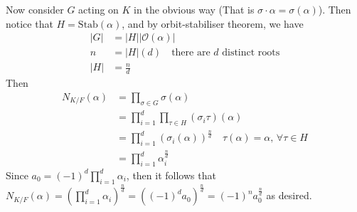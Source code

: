 \begin{solution}
\begin{enumerate}[(a)]
        Now consider $G$ acting on $K$ in the obvious way (That is $\sigma \cdot \alpha = \sigma(\alpha)$). Then notice that $H=\text{Stab}(\alpha)$, and by orbit-stabiliser theorem, we have
        \begin{align*}
            |G|&=|H||\mathcal{O}(\alpha)|\\
            n&=|H|(d)\quad\text{there are $d$ distinct roots}\\
            |H|&=\frac{n}{d}
        \end{align*}
        Then
        \begin{align*}
            N_{K/F}(\alpha)&=\prod_{\sigma\in G}\sigma(\alpha)\\
            &=\prod_{i=1}^{d}\prod_{\tau\in H}(\sigma_{i}\tau)(\alpha)\\
            &=\prod_{i=1}^{d}\left(\sigma_{i}(\alpha)\right)^{\frac{n}{d}}\quad\tau(\alpha)=\alpha,\,\forall\tau\in H\\
            &=\prod_{i=1}^{d}\alpha_{i}^{\frac{n}{d}}
        \end{align*}
        Since $a_{0}=(-1)^{d}\prod_{i=1}^{d}\alpha_{i}$, then it follows that $N_{K/F}(\alpha)=\left(\prod_{i=1}^{d}\alpha_{i}\right)^{\frac{n}{d}}=\left((-1)^{d}a_{0}\right)^{\frac{n}{d}}=(-1)^{n}a_{0}^{\frac{n}{d}}$ as desired.
    \end{enumerate}
\end{solution}